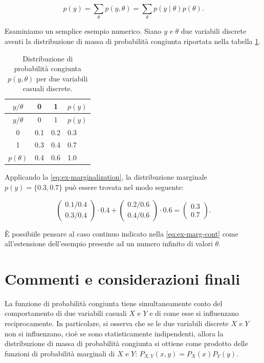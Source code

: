 \documentclass[
  11pt,
]{krantz}
\theoremstyle{definition}
\theoremstyle{definition}
\theoremstyle{definition}
\theoremstyle{definition}
\theoremstyle{remark}
\begin{document}
\begin{equation}
p(y) = \sum_{\theta} p(y, \theta) = \sum_{\theta} p(y \mid \theta) p(\theta).
\label{eq:ex-marginalization}
\end{equation}

Esaminiamo un semplice esempio numerico. Siano \(y\) e \(\theta\) due variabili discrete aventi la distribuzione di massa di probabilità congiunta riportata nella tabella \ref{tab:ex-marg}.

\begin{longtable}[]{@{}cccl@{}}
\caption{\label{tab:ex-marg} Distribuzione di probabilità congiunta \(p(y, \theta)\) per due variabili casuali discrete.}\tabularnewline
\toprule
\(y / \theta\) & 0 & 1 & \(p(y)\) \\
\midrule
\endfirsthead
\toprule
\(y / \theta\) & 0 & 1 & \(p(y)\) \\
\midrule
\endhead
0 & 0.1 & 0.2 & 0.3 \\
1 & 0.3 & 0.4 & 0.7 \\
\(p(\theta)\) & 0.4 & 0.6 & 1.0 \\
\bottomrule
\end{longtable}

Applicando la \eqref{eq:ex-marginalization}, la distribuzione marginale \(p(y) = \{0.3, 0.7\}\) può essere trovata nel modo seguente:

\[
\begin{pmatrix}
    0.1 / 0.4 \\
    0.3 / 0.4
\end{pmatrix} \cdot 0.4 +
\begin{pmatrix}
    0.2 / 0.6 \\
    0.4 / 0.6
\end{pmatrix} \cdot 0.6 =
\begin{pmatrix}
    0.3 \\
   0.7
\end{pmatrix}.
\]

È possibiile pensare al caso continuo indicato nella \eqref{eq:ex-marg-cont} come all'estensione dell'esempio presente ad un numero infinito di valori \(\theta\).

\hypertarget{commenti-e-considerazioni-finali-3}{%
\section*{Commenti e considerazioni finali}\label{commenti-e-considerazioni-finali-3}}


La funzione di probabilità congiunta tiene simultaneamente conto del comportamento di due variabili casuali \(X\) e \(Y\) e di come esse si influenzano reciprocamente. In particolare, si osserva che se le due variabili discrete \(X\) e \(Y\) non si influenzano, cioè se sono statisticamente indipendenti, allora la distribuzione di massa di probabilità congiunta si ottiene come prodotto delle funzioni di probabilità marginali di \(X\) e \(Y\): \(P_{X, Y}(x, y) = P_X(x) P_Y(y)\).
\end{document}
